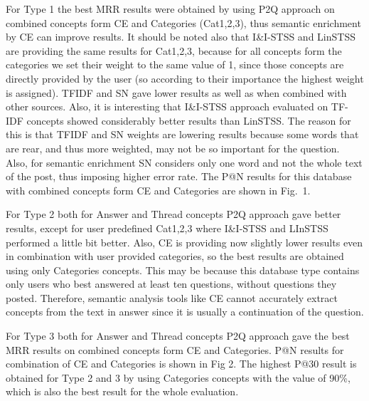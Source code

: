 \documentclass[conference]{IEEEtran}
\begin{document}
For Type 1 the best MRR results were obtained by using P2Q approach on combined concepts form CE and Categories (Cat1,2,3), thus semantic enrichment by CE can improve results. It should be noted also that I\&I-STSS and LinSTSS are providing the same results for Cat1,2,3, because for all concepts form the categories we set their weight to the same value of 1, since those concepts are directly provided by the user (so according to their importance the highest weight is assigned). TFIDF and SN gave lower results as well as when combined with other sources. Also, it is interesting that I\&I-STSS approach evaluated on TF-IDF concepts showed considerably better results than LinSTSS. The reason for this is that TFIDF and SN weights are lowering results because some words that are rear, and thus more weighted, may not be so important for the question. Also, for semantic enrichment SN considers only one word and not the whole text of the post, thus imposing higher error rate. The P@N results for this database with combined concepts form CE and Categories are shown in Fig.~1.

For Type 2 both for Answer and Thread concepts P2Q approach gave better results, except for user predefined Cat1,2,3 where I\&I-STSS and LInSTSS performed a little bit better. Also, CE is providing now slightly lower results even in combination with user provided categories, so the best results are obtained using only Categories concepts. This may be because this database type contains only users who best answered at least ten questions, without questions they posted.  Therefore, semantic analysis tools like CE cannot accurately extract concepts from the text in answer since it is usually a continuation of the question.

For Type 3 both for Answer and Thread concepts P2Q approach gave the best MRR results on combined concepts form CE and Categories. P@N results for combination of CE and Categories is shown in Fig 2. The highest P@30 result is obtained for Type 2 and 3 by using Categories concepts with the value of 90\%, which is also the best result for the whole evaluation.
\end{document}
